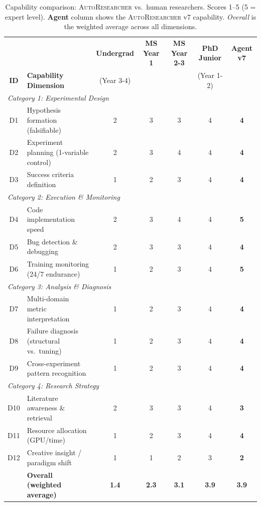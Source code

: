 \documentclass[11pt,a4paper]{article}
\newcommand{\sysname}{\textsc{AutoResearcher}}
\begin{document}
\begin{table}[t]
\centering
\small
\begin{threeparttable}
\caption{Capability comparison: \sysname{} vs.\ human researchers.
Scores 1--5 (5 = expert level).
\textbf{Agent} column shows the \sysname{} v7 capability.
\textit{Overall} is the weighted average across all dimensions.}
\label{tab:human}
\begin{tabularx}{\linewidth}{c X c c c c c}
\toprule
& & \textbf{Undergrad} & \textbf{MS Year 1} & \textbf{MS Year 2-3} & \textbf{PhD Junior} & \textbf{Agent v7} \\
\textbf{ID} & \textbf{Capability Dimension} & (Year 3-4) & & & (Year 1-2) & \\
\midrule
\multicolumn{7}{l}{\textit{Category 1: Experimental Design}} \\
D1 & Hypothesis formation (falsifiable)     & 2 & 3 & 3 & 4 & \textbf{4} \\
D2 & Experiment planning (1-variable control) & 2 & 3 & 4 & 4 & \textbf{4} \\
D3 & Success criteria definition            & 1 & 2 & 3 & 4 & \textbf{4} \\
\midrule
\multicolumn{7}{l}{\textit{Category 2: Execution \& Monitoring}} \\
D4 & Code implementation speed              & 2 & 3 & 4 & 4 & \textbf{5} \\
D5 & Bug detection \& debugging             & 2 & 3 & 3 & 4 & \textbf{4} \\
D6 & Training monitoring (24/7 endurance)   & 1 & 2 & 3 & 4 & \textbf{5} \\
\midrule
\multicolumn{7}{l}{\textit{Category 3: Analysis \& Diagnosis}} \\
D7 & Multi-domain metric interpretation     & 1 & 2 & 3 & 4 & \textbf{4} \\
D8 & Failure diagnosis (structural vs.\ tuning) & 1 & 2 & 3 & 4 & \textbf{4} \\
D9 & Cross-experiment pattern recognition   & 1 & 2 & 3 & 4 & \textbf{4} \\
\midrule
\multicolumn{7}{l}{\textit{Category 4: Research Strategy}} \\
D10 & Literature awareness \& retrieval     & 2 & 3 & 3 & 4 & \textbf{3} \\
D11 & Resource allocation (GPU/time)        & 1 & 2 & 3 & 4 & \textbf{4} \\
D12 & Creative insight / paradigm shift     & 1 & 1 & 2 & 3 & \textbf{2} \\
\midrule
& \textbf{Overall (weighted average)} & \textbf{1.4} & \textbf{2.3} & \textbf{3.1} & \textbf{3.9} & \textbf{3.9} \\
\bottomrule
\end{tabularx}
\end{threeparttable}
\end{table}
\end{document}
